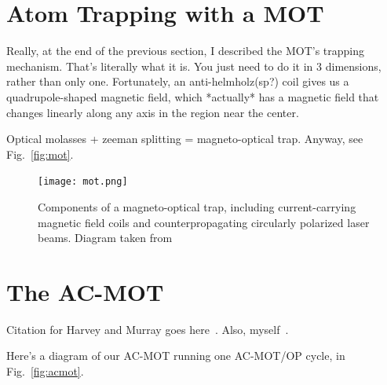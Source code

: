 \section{Atom Trapping with a MOT}

Really, at the end of the previous section, I described the MOT's trapping mechanism.  That's literally what it is.  You just need to do it in 3 dimensions, rather than only one.  Fortunately, an anti-helmholz(sp?) coil gives us a quadrupole-shaped magnetic field, which *actually* has a magnetic field that changes linearly along any axis in the region near the center.   

Optical molasses + zeeman splitting = magneto-optical trap.  Anyway, see Fig.~\ref{fig:mot}.


\begin{figure}[h!!!!!t!]
	\centering
		\texttt{[image: mot.png]}
		\caption{Components of a magneto-optical trap, including current-carrying magnetic field coils and counterpropagating circularly polarized laser beams. Diagram taken from~\cite{thesis}}
		\label{fig:mot}
    	\label{fig:themot}
\end{figure}


\section{The AC-MOT}
\label{sec:acmot}
Citation for Harvey and Murray goes here~\cite{harveymurray}.  Also, myself~\cite{thesis}.

Here's a diagram of our AC-MOT running one AC-MOT/OP cycle, in Fig.~\ref{fig:acmot}.

